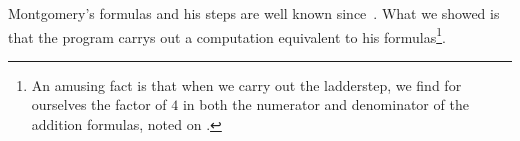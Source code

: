 Montgomery's formulas and his steps are well known
since~\cite{M:87:SPEC}.  What we showed is that the program carrys out
a computation equivalent to his formulas\footnote{An amusing fact is
  that when we carry out the ladderstep, we find for ourselves the factor of $4$
  in both the numerator and denominator of the addition formulas, 
  noted on \cite[p.~261]{M:87:SPEC}.}.

%
% 
%

